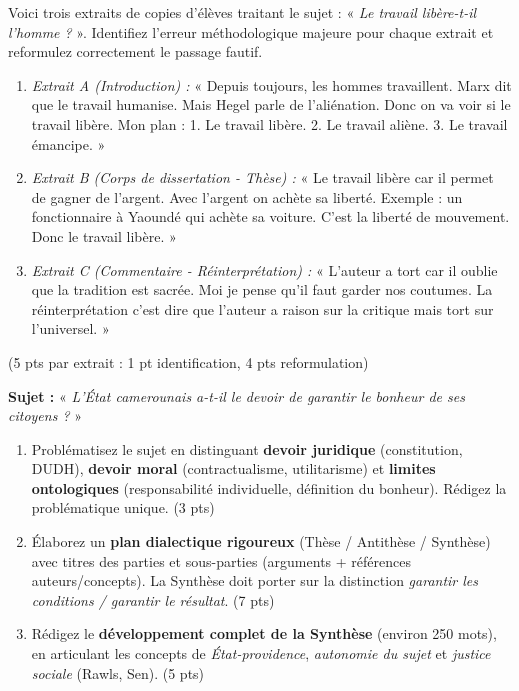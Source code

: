 \documentclass[11pt]{article}
\begin{document}
\begin{exercice}
Voici trois extraits de copies d'élèves traitant le sujet : « \textit{Le travail libère-t-il l'homme ?} ». Identifiez l'erreur méthodologique majeure pour chaque extrait et reformulez correctement le passage fautif.
\begin{enumerate}
    \item \textit{Extrait A (Introduction) :} « Depuis toujours, les hommes travaillent. Marx dit que le travail humanise. Mais Hegel parle de l'aliénation. Donc on va voir si le travail libère. Mon plan : 1. Le travail libère. 2. Le travail aliène. 3. Le travail émancipe. »
    \item \textit{Extrait B (Corps de dissertation - Thèse) :} « Le travail libère car il permet de gagner de l'argent. Avec l'argent on achète sa liberté. Exemple : un fonctionnaire à Yaoundé qui achète sa voiture. C'est la liberté de mouvement. Donc le travail libère. »
    \item \textit{Extrait C (Commentaire - Réinterprétation) :} « L'auteur a tort car il oublie que la tradition est sacrée. Moi je pense qu'il faut garder nos coutumes. La réinterprétation c'est dire que l'auteur a raison sur la critique mais tort sur l'universel. »
\end{enumerate}
\hfill (5 pts par extrait : 1 pt identification, 4 pts reformulation)
\end{exercice}

\begin{exercice}
\textbf{Sujet :} « \textit{L'État camerounais a-t-il le devoir de garantir le bonheur de ses citoyens ?} »
\begin{enumerate}
    \item Problématisez le sujet en distinguant \textbf{devoir juridique} (constitution, DUDH), \textbf{devoir moral} (contractualisme, utilitarisme) et \textbf{limites ontologiques} (responsabilité individuelle, définition du bonheur). Rédigez la problématique unique. \hfill (3 pts)
    \item Élaborez un \textbf{plan dialectique rigoureux} (Thèse / Antithèse / Synthèse) avec titres des parties et sous-parties (arguments + références auteurs/concepts). La Synthèse doit porter sur la distinction \textit{garantir les conditions / garantir le résultat}. \hfill (7 pts)
    \item Rédigez le \textbf{développement complet de la Synthèse} (environ 250 mots), en articulant les concepts de \textit{État-providence}, \textit{autonomie du sujet} et \textit{justice sociale} (Rawls, Sen). \hfill (5 pts)
\end{enumerate}
\end{exercice}
\end{document}
